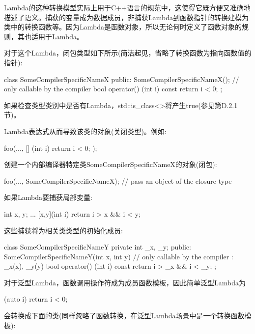 \begin{notice}Lambda的这种转换模型实际上用于C++语言的规范中，这使得它既方便又准确地描述了语义。捕获的变量成为数据成员，非捕获Lambda到函数指针的转换建模为类中的转换函数等。因为Lambda是函数对象，所以无论何时定义了函数对象的规则，其也适用于Lambda。
\end{notice}

对于这个Lambda，闭包类型如下所示(简洁起见，省略了转换函数为指向函数值的指针):

\begin{cpp}
class SomeCompilerSpecificNameX
{
	public:
	SomeCompilerSpecificNameX(); // only callable by the compiler
	bool operator() (int i) const
	{
		return i < 0;
	}
};
\end{cpp}

如果检查类型类别中是否有Lambda，std::is\_class<>将产生true(参见第D.2.1节)。

Lambda表达式从而导致该类的对象(关闭类型)。例如:

\begin{cpp}
foo(...,
	[] (int i) {
		return i < 0;
	});
\end{cpp}

创建一个内部编译器特定类SomeCompilerSpecificNameX的对象(闭包):

\begin{cpp}
foo(...,
	SomeCompilerSpecificNameX{}); // pass an object of the closure type
\end{cpp}

如果Lambda要捕获局部变量:

\begin{cpp}
int x, y;
...
[x,y](int i) {
	return i > x && i < y;
}
\end{cpp}

这些捕获将为相关类类型的初始化成员:

\begin{cpp}
class SomeCompilerSpecificNameY {
private
	int _x, _y;
public:
	SomeCompilerSpecificNameY(int x, int y) // only callable by the compiler
	: _x(x), _y(y) {
	}
	bool operator() (int i) const {
		return i > _x && i < _y;
	}
};
\end{cpp}

对于泛型Lambda，函数调用操作符成为成员函数模板，因此简单泛型Lambda为

\begin{cpp}
[] (auto i) {
	return i < 0;
}
\end{cpp}

会转换成下面的类(同样忽略了函数转换，在泛型Lambda场景中是一个转换函数模板):

